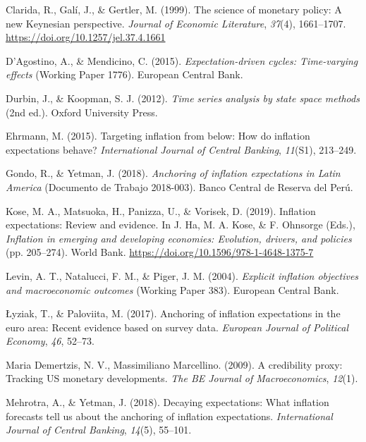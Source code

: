 \documentclass[
  10.5pt,
  letterpaper,
  twocolumn]{article}
\newlength{\cslhangindent}
\newenvironment{CSLReferences}[2] %
 {\begin{list}{}{%
  \setlength{\itemindent}{0pt}
  \setlength{\leftmargin}{0pt}
  \setlength{\parsep}{0pt}
  \ifodd #1
   \setlength{\leftmargin}{\cslhangindent}
   \setlength{\itemindent}{-1\cslhangindent}
  \fi
  \setlength{\itemsep}{#2\baselineskip}}}
 {\end{list}}
\begin{document}
\begin{CSLReferences}{1}{0}
Clarida, R., Galí, J., \& Gertler, M. (1999). The science of monetary
policy: A new {Keynesian} perspective. \emph{Journal of Economic
Literature}, \emph{37}(4), 1661--1707.
\url{https://doi.org/10.1257/jel.37.4.1661}

D'Agostino, A., \& Mendicino, C. (2015). \emph{Expectation-driven
cycles: Time-varying effects} (Working Paper 1776). European Central
Bank.

Durbin, J., \& Koopman, S. J. (2012). \emph{Time series analysis by
state space methods} (2nd ed.). Oxford University Press.

Ehrmann, M. (2015). Targeting inflation from below: How do inflation
expectations behave? \emph{International Journal of Central Banking},
\emph{11}(S1), 213--249.

Gondo, R., \& Yetman, J. (2018). \emph{Anchoring of inflation
expectations in {Latin America}} (Documento de Trabajo 2018-003). Banco
Central de Reserva del Perú.

Kose, M. A., Matsuoka, H., Panizza, U., \& Vorisek, D. (2019). Inflation
expectations: Review and evidence. In J. Ha, M. A. Kose, \& F. Ohnsorge
(Eds.), \emph{Inflation in emerging and developing economies: Evolution,
drivers, and policies} (pp. 205--274). World Bank.
\url{https://doi.org/10.1596/978-1-4648-1375-7}

Levin, A. T., Natalucci, F. M., \& Piger, J. M. (2004). \emph{Explicit
inflation objectives and macroeconomic outcomes} (Working Paper 383).
European Central Bank.

Łyziak, T., \& Paloviita, M. (2017). Anchoring of inflation expectations
in the euro area: Recent evidence based on survey data. \emph{European
Journal of Political Economy}, \emph{46}, 52--73.

Maria Demertzis, N. V., Massimiliano Marcellino. (2009). A credibility
proxy: Tracking US monetary developments. \emph{The BE Journal of
Macroeconomics}, \emph{12}(1).

Mehrotra, A., \& Yetman, J. (2018). Decaying expectations: What
inflation forecasts tell us about the anchoring of inflation
expectations. \emph{International Journal of Central Banking},
\emph{14}(5), 55--101.


\end{CSLReferences}
\end{document}
